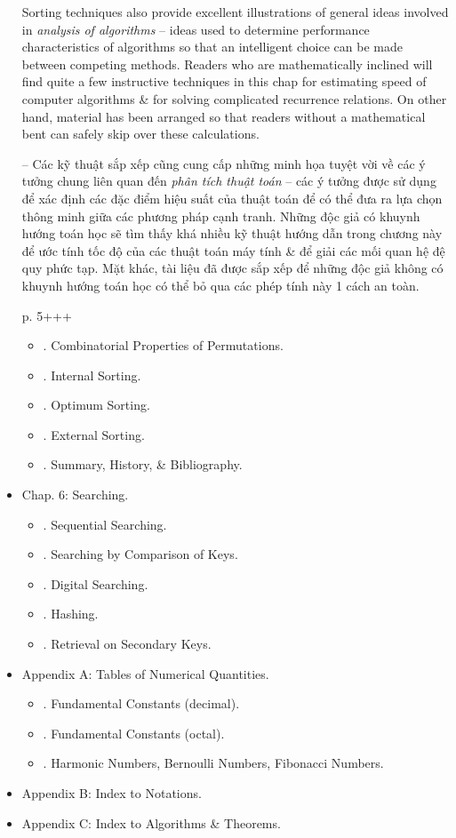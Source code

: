 \documentclass{article}
\begin{document}
\begin{itemize}
    Sorting techniques also provide excellent illustrations of general ideas involved in {\it analysis of algorithms} -- ideas used to determine performance characteristics of algorithms so that an intelligent choice can be made between competing methods. Readers who are mathematically inclined will find quite a few instructive techniques in this chap for estimating speed of computer algorithms \& for solving complicated recurrence relations. On other hand, material has been arranged so that readers without a mathematical bent can safely skip over these calculations.
    
    -- Các kỹ thuật sắp xếp cũng cung cấp những minh họa tuyệt vời về các ý tưởng chung liên quan đến {\it phân tích thuật toán} -- các ý tưởng được sử dụng để xác định các đặc điểm hiệu suất của thuật toán để có thể đưa ra lựa chọn thông minh giữa các phương pháp cạnh tranh. Những độc giả có khuynh hướng toán học sẽ tìm thấy khá nhiều kỹ thuật hướng dẫn trong chương này để ước tính tốc độ của các thuật toán máy tính \& để giải các mối quan hệ đệ quy phức tạp. Mặt khác, tài liệu đã được sắp xếp để những độc giả không có khuynh hướng toán học có thể bỏ qua các phép tính này 1 cách an toàn.
    
    p. 5+++
    \begin{itemize}
        \item {. Combinatorial Properties of Permutations.}
        \item {. Internal Sorting.}
        \item {. Optimum Sorting.}
        \item {. External Sorting.}
        \item {. Summary, History, \& Bibliography.}
    \end{itemize}
    \item {\sf Chap. 6: Searching.}
    \begin{itemize}
        \item {. Sequential Searching.}
        \item {. Searching by Comparison of Keys.}
        \item {. Digital Searching.}
        \item {. Hashing.}
        \item {. Retrieval on Secondary Keys.}
    \end{itemize}
    \item {\sf Appendix A: Tables of Numerical Quantities.}
    \begin{itemize}
        \item {. Fundamental Constants (decimal).}
        \item {. Fundamental Constants (octal).}
        \item {. Harmonic Numbers, Bernoulli Numbers, Fibonacci Numbers.}
    \end{itemize}
    \item {\sf Appendix B: Index to Notations.}
    \item {\sf Appendix C: Index to Algorithms \& Theorems.}
\end{itemize}
\end{document}
